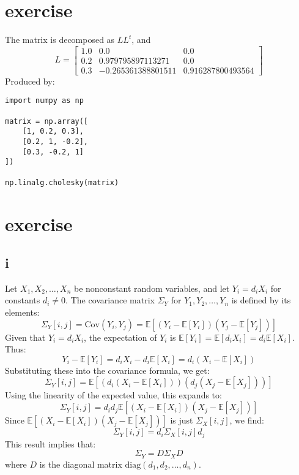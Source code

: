 \documentclass{article}
\begin{document}
\section{exercise}
The matrix is decomposed as $LL^t$, and
\[L = \left[\begin{matrix}1.0 & 0.0 & 0.0\\0.2 & 0.979795897113271 & 0.0\\0.3 & -0.265361388801511 & 0.916287800493564\end{matrix}\right]\]
Produced by:
\begin{lstlisting}
import numpy as np

matrix = np.array([
    [1, 0.2, 0.3],
    [0.2, 1, -0.2],
    [0.3, -0.2, 1]
])

np.linalg.cholesky(matrix)
\end{lstlisting}
\section{exercise}
\subsection*{i}
Let \( X_1, X_2, \ldots, X_n \) be nonconstant random variables, and let \( Y_i = d_i X_i \) for constants \( d_i \neq 0 \).
The covariance matrix \(\Sigma_Y\) for \(Y_1, Y_2, \ldots, Y_n\) is defined by its elements:
\[
    \Sigma_Y[i,j] = \text{Cov}(Y_i, Y_j) = \mathbb{E}[(Y_i - \mathbb{E}[Y_i])(Y_j - \mathbb{E}[Y_j])]
\]
Given that \( Y_i = d_i X_i \), the expectation of \( Y_i \) is \( \mathbb{E}[Y_i] = \mathbb{E}[d_i X_i] = d_i \mathbb{E}[X_i] \). Thus:
\[
    Y_i - \mathbb{E}[Y_i] = d_i X_i - d_i \mathbb{E}[X_i] = d_i (X_i - \mathbb{E}[X_i])
\]
Substituting these into the covariance formula, we get:
\[
    \Sigma_Y[i,j] = \mathbb{E}[(d_i (X_i - \mathbb{E}[X_i]))(d_j (X_j - \mathbb{E}[X_j]))]
\]
Using the linearity of the expected value, this expands to:
\[
    \Sigma_Y[i,j] = d_i d_j \mathbb{E}[(X_i - \mathbb{E}[X_i])(X_j - \mathbb{E}[X_j])]
\]
Since \(\mathbb{E}[(X_i - \mathbb{E}[X_i])(X_j - \mathbb{E}[X_j])]\) is just \(\Sigma_X[i,j]\), we find:
\[
    \Sigma_Y[i,j] = d_i \Sigma_X[i,j] d_j
\]
This result implies that:
\[
    \Sigma_Y = D \Sigma_X D
\]
where \( D \) is the diagonal matrix \(\text{diag}(d_1, d_2, \ldots, d_n)\).
\end{document}
